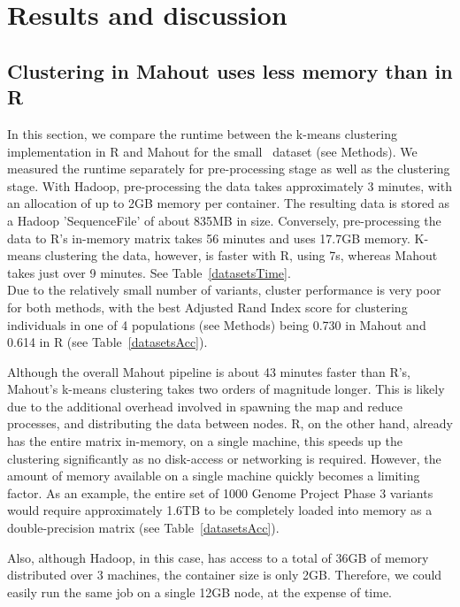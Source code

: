 \documentclass{bioinfo}
\begin{document}


\section*{Results and discussion}


\subsection*{Clustering in Mahout uses less memory than in R}
In this section, we compare the runtime between the k-means clustering implementation in R and Mahout for the small \NinteenPhaseone\ dataset (see Methods). 
We measured the runtime separately for pre-processing stage as well as the clustering stage. 
With Hadoop, pre-processing the data takes approximately 3 minutes, with an allocation of up to 2GB memory per container. The resulting data is stored as a Hadoop 'SequenceFile' of about 835MB in size.
Conversely,  pre-processing the data to R's in-memory matrix takes 56 minutes and uses 17.7GB memory. 
K-means clustering the data, however, is faster with R, using 7s, whereas Mahout takes just over 9 minutes. See Table~\ref{datasetsTime}. \\
Due to the relatively small number of variants, cluster performance is very poor for both methods, with the best Adjusted Rand Index score for clustering individuals in one of 4 populations (see Methods) being 0.730 in Mahout and 0.614 in R (see Table~\ref{datasetsAcc}).

Although the overall Mahout pipeline is about 43 minutes faster than R's, Mahout's k-means clustering takes two orders of magnitude longer. 
This is likely due to the additional overhead involved in spawning the map and reduce processes, and distributing the data between nodes.
R, on the other hand, already has the entire matrix in-memory, on a single machine, this speeds up the clustering significantly as no disk-access or networking is required. However, the amount of memory available on a single machine quickly becomes a limiting factor. 
As an example, the entire set of 1000 Genome Project Phase 3 variants would require approximately 1.6TB to be completely loaded into memory as a double-precision matrix (see Table~\ref{datasetsAcc}). 

Also, although Hadoop, in this case, has access to a total of 36GB of memory distributed over 3 machines, the container size is only 2GB. Therefore, we could
easily run the same job on a single 12GB node, at the expense of time. 
\end{document}
